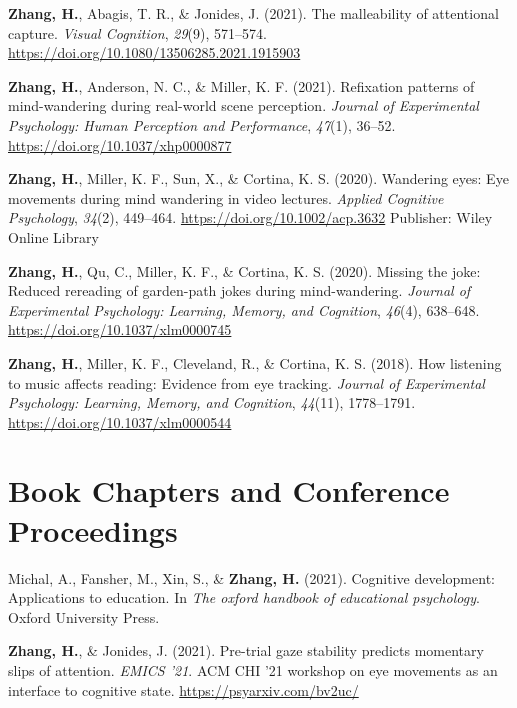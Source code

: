 \documentclass[11pt,a4paper,]{awesome-cv}
\newcommand{\CSLBlock}[1]{#1\hfill\break}
\begin{document}
\leavevmode{}%
\textbf{Zhang, H.}, Abagis, T. R., \& Jonides, J. (2021). The
malleability of attentional capture. \emph{Visual Cognition},
\emph{29}(9), 571--574.
\url{https://doi.org/10.1080/13506285.2021.1915903}

\leavevmode{}%
\textbf{Zhang, H.}, Anderson, N. C., \& Miller, K. F. (2021). Refixation
patterns of mind-wandering during real-world scene perception.
\emph{Journal of Experimental Psychology: Human Perception and
Performance}, \emph{47}(1), 36--52.
\url{https://doi.org/10.1037/xhp0000877}

\leavevmode{}%
\textbf{Zhang, H.}, Miller, K. F., Sun, X., \& Cortina, K. S. (2020).
Wandering eyes: Eye movements during mind wandering in video lectures.
\emph{Applied Cognitive Psychology}, \emph{34}(2), 449--464.
\url{https://doi.org/10.1002/acp.3632}
\CSLBlock{Publisher: Wiley Online Library}

\leavevmode{}%
\textbf{Zhang, H.}, Qu, C., Miller, K. F., \& Cortina, K. S. (2020).
Missing the joke: Reduced rereading of garden-path jokes during
mind-wandering. \emph{Journal of Experimental Psychology: Learning,
Memory, and Cognition}, \emph{46}(4), 638--648.
\url{https://doi.org/10.1037/xlm0000745}

\leavevmode{}%
\textbf{Zhang, H.}, Miller, K. F., Cleveland, R., \& Cortina, K. S.
(2018). How listening to music affects reading: Evidence from eye
tracking. \emph{Journal of Experimental Psychology: Learning, Memory,
and Cognition}, \emph{44}(11), 1778--1791.
\url{https://doi.org/10.1037/xlm0000544}

\hypertarget{book-chapters-and-conference-proceedings}{%
\section{Book Chapters and Conference
Proceedings}\label{book-chapters-and-conference-proceedings}}

\hypertarget{bibliography}{}
\leavevmode{}%
Michal, A., Fansher, M., Xin, S., \& \textbf{Zhang, H.} (2021).
Cognitive development: Applications to education. In \emph{The oxford
handbook of educational psychology}. Oxford University Press.

\leavevmode{}%
\textbf{Zhang, H.}, \& Jonides, J. (2021). Pre-trial gaze stability
predicts momentary slips of attention. \emph{EMICS '21}. ACM CHI '21
workshop on eye movements as an interface to cognitive state.
\url{https://psyarxiv.com/bv2uc/}
\end{document}
